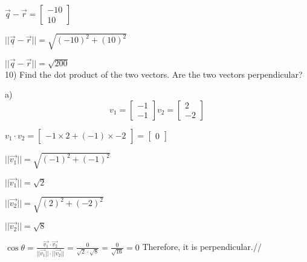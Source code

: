 \documentclass[a4paper]{article}
\begin{document}
$\vec{q}-\vec{r} = \begin{bmatrix}
-10\\
10
\end{bmatrix}$

$||\vec{q}-\vec{r}|| = \sqrt{(-10)^2+(10)^2}$

$||\vec{q}-\vec{r}|| = \sqrt{200}$\\

10) Find the dot product of the two vectors. Are the two vectors perpendicular?

a) $$v_1 = \begin{bmatrix}
-1\\
-1
\end{bmatrix} v_2 =
\begin{bmatrix}
2\\
-2
\end{bmatrix}$$

$v_1 \cdot v_2 = \begin{bmatrix}
-1\times2+(-1)\times-2
\end{bmatrix} = \begin{bmatrix}
0
\end{bmatrix}$

$||\vec{v_1}|| = \sqrt{(-1)^2+(-1)^2}$

$||\vec{v_1}|| = \sqrt{2}$

$||\vec{v_2}|| = \sqrt{(2)^2+(-2)^2}$

$||\vec{v_2}|| = \sqrt{8}$

$\cos\theta = \frac{\vec{v_1}\cdot\vec{v_2}}{||\vec{v_1}||\cdot||\vec{v_2}||} = \frac{0}{\sqrt{2}\cdot\sqrt{8}} = \frac{0}{\sqrt{16}} = 0$ Therefore, it is perpendicular.//
\end{document}
